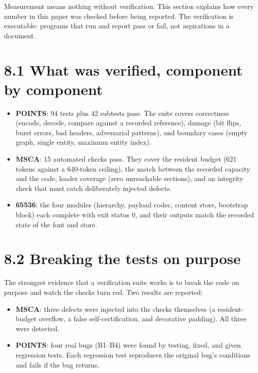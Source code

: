 \label{sec:validation}

Measurement means nothing without verification. This section explains how every number in this paper was checked before being reported. The verification is executable: programs that run and report pass or fail, not aspirations in a document.

\section*{8.1 What was verified, component by component}

\begin{itemize}
\item \textbf{POINTS}: 94 tests plus 42 subtests pass. The suite covers correctness (encode, decode, compare against a recorded reference), damage (bit flips, burst errors, bad headers, adversarial patterns), and boundary cases (empty graph, single entity, maximum entity index).
\item \textbf{MSCA}: 15 automated checks pass. They cover the resident budget (621 tokens against a 640-token ceiling), the match between the recorded capacity and the code, loader coverage (zero unreachable sections), and an integrity check that must catch deliberately injected defects.
\item \textbf{65536}: the four modules (hierarchy, payload codec, content store, bootstrap block) each complete with exit status 0, and their outputs match the recorded state of the font and store.
\end{itemize}

\section*{8.2 Breaking the tests on purpose}

The strongest evidence that a verification suite works is to break the code on purpose and watch the checks turn red. Two results are reported:

\begin{itemize}
\item \textbf{MSCA}: three defects were injected into the checks themselves (a resident-budget overflow, a false self-certification, and decorative padding). All three were detected.
\item \textbf{POINTS}: four real bugs (B1--B4) were found by testing, fixed, and given regression tests. Each regression test reproduces the original bug's conditions and fails if the bug returns.
\end{itemize}

